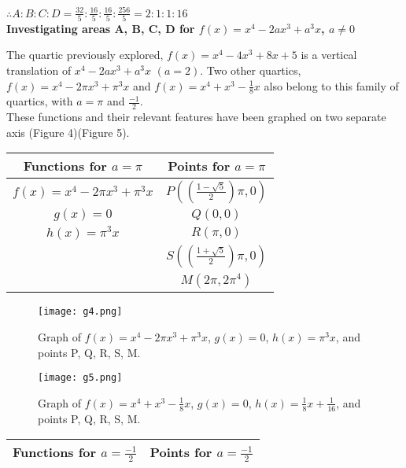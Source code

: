 \documentclass{homework}
\begin{document}
\begin{center}
    $ \therefore A:B:C:D=\frac{32}{5}:\frac{16}{5}:\frac{16}{5}:\frac{256}{5}=2:1:1:16 $ \vspace{1.3em}\\ 
    \textbf{\large{Investigating areas A, B, C, D for $f(x)= x^4-2ax^3+a^3x$, $a\neq0$}}
\end{center} 
\begin{flushleft}
\vspace{0.7em}
    The quartic previously explored, $f(x)=x^4-4x^3+8x+5$ is a vertical translation of $x^4-2ax^3+a^3x$ $(a=2)$. Two other quartics, $f(x)=x^4-2\pi x^3+\pi^3x$ and $f(x)=x^4+x^3-\frac{1}{8}x$ also belong to this family of quartics, with $a =\pi$ and $\frac{-1}{2}$. \vspace{0.8em}
    \\
    These functions and their relevant features have been graphed on two separate axis (Figure 4)(Figure 5).
\begin{paracol}{2}
\vspace{1.4em}
\renewcommand{\arraystretch}{1.6}
  \begin{tabular}{|c|c|} \hline
  Functions for $a=\pi$ & Points for $a=\pi$ \\ \hline
  $f(x)=x^4-2\pi x^3+\pi^3x$ & $P((\frac{1-\sqrt{5}}{2})\pi, 0)$ \\ \hline
  $g(x)=0$ & $Q(0,0)$ \\ \hline
  $h(x)=\pi^3x$ & $R(\pi, 0)$ \\ \hline
   & $S((\frac{1+\sqrt{5}}{2})\pi,0)$ \\ \hline
   & $M(2\pi,2\pi^4)$ \\ \hline
  \end{tabular}
\switchcolumn
\begin{figure}[htp]
\centering
    \texttt{[image: g4.png]}
    \centering
    \caption{Graph of $f(x)=x^4-2\pi x^3+\pi^3x$, $g(x)=0$, $h(x)=\pi^3x$, and points P, Q, R, S, M.}
\end{figure}
\begin{figure}
\texttt{[image: g5.png]}
\caption{Graph of $f(x)=x^4+x^3-\frac{1}{8}x$, $g(x)=0$, $h(x)=\frac{1}{8}x+\frac{1}{16}$, and points P, Q, R, S, M.}
\end{figure}
\switchcolumn \newpage
\setlength{\tabcolsep}{1.6em}
\renewcommand{\arraystretch}{1.6}
  \begin{tabular}{|c|c|} \hline
  Functions for $a=\frac{-1}{2}$    &   Points for $a=\frac{-1}{2}$\\ \hline

\end{tabular}
\end{paracol}
\end{flushleft}
\end{document}
